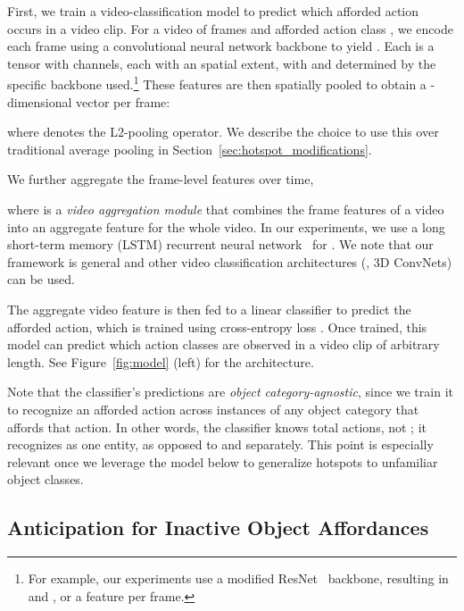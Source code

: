 \documentclass[10pt,twocolumn,letterpaper]{article}
\newcommand{\reffig}[1]{Figure~\ref{#1}}
\newcommand{\refsec}[1]{Section~\ref{#1}}
\begin{document}
First, we train a video-classification model to predict which afforded action occurs in a video clip. For a video of  frames  and afforded action class , we encode each frame using a convolutional neural network backbone to yield . Each  is a tensor with  channels, each with an  spatial extent, 
with  and  determined by the specific backbone used.\footnote{For example, our experiments use a modified ResNet~\cite{he2016deep} backbone, resulting in  and , or a  feature per frame.}  These features are then spatially pooled to obtain a -dimensional vector per frame:

where  denotes the L2-pooling operator.  We describe the choice to use this over traditional average pooling in \refsec{sec:hotspot_modifications}.


We further aggregate the frame-level features over time,

where  is a \emph{video aggregation module} that combines the frame features of a video into an aggregate feature  for the whole video. 
In our experiments, we use a long short-term memory (LSTM) recurrent neural network~\cite{hochreiter1997long} for . We note that our framework is general and other video classification architectures (\eg, 3D ConvNets) can be used.



The aggregate video feature  is then fed to a linear classifier to predict the afforded action, which is trained using cross-entropy loss .
Once trained, this model can predict which action classes are observed in a video clip of arbitrary length. 
See \reffig{fig:model} (left) for the architecture. 


Note that the classifier's predictions are \emph{object category-agnostic}, since we train it to recognize an afforded action across instances of any object category that affords that action.  In other words, the classifier knows  total actions, not ; it recognizes  as one entity, as opposed to  and  separately. This point is especially relevant once we leverage the model below to generalize hotspots to unfamiliar object classes.










\subsection{Anticipation for Inactive Object Affordances}\label{sec:distill}
\end{document}
